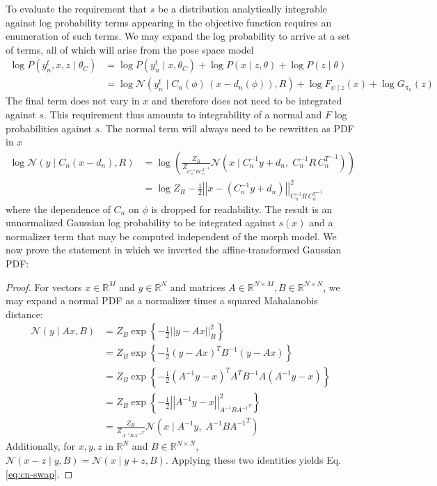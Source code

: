 \documentclass{article}         %
\newcommand{\inv}{^{-1}}
\newcommand{\RR}{\mathbb{R}}
\newcommand{\NN}{\mathcal{N}}
\newcommand{\norm}[1]{\left|\left| #1 \right|\right|}
\newcommand{\cb}[1]{\left\{ #1 \right\}}
\newcommand{\pn}[1]{\left( #1 \right)}
\begin{document}
To evaluate the requirement that $s$ be a distribution analytically integrable against log probability terms appearing in the objective function requires an enumeration of such terms. We may expand the log probability to arrive at a set of terms, all of which will arise from the pose space model
\begin{align}
    \log P(y^t_n, x, z \mid \theta_C) &= \log P(y^t_n \mid x, \theta_C) + \log P(x\mid z, \theta) + \log P(z\mid \theta) \\
    &= \log \NN(y^t_n \mid C_n(\phi)\, (x - d_n(\phi)), R) + \log F_{\psi\mid z}(x) + \log G_{\pi_n}(z)
    \label{eq:logprob-terms}
\end{align}
The final term does not vary in $x$ and therefore does not need to be integrated against $s$. This requirement thus amounts to integrability of a normal and $F$ log probabilities against $s$. The normal term will always need to be rewritten as PDF in $x$
\begin{align}
    \log \NN(y\mid C_n(x - d_n), R) &= \log\pn{\frac{Z_{R}}{Z_{C_n\inv R {C_n^T}\inv}} \NN\pn{x\mid C_n\inv y + d_n,\; C_n\inv R\, {C_n^T}\inv}} \\ &= \log Z_{R} - \frac{1}{2}\norm{x - (C_n\inv y + d_n)}^2_{C_n\inv R\, {C_n^T}\inv}
    \label{eq:cn-swap}
\end{align}
where the dependence of $C_n$ on $\phi$ is dropped for readability. The result is an unnormalized Gaussian log probability to be integrated against $s(x)$ and a normalizer term that may be computed independent of the morph model. We now prove the statement in which we inverted the affine-transformed Gaussian PDF:
\begin{proof} For vectors $x\in \RR^M$ and $y\in \RR^N$ and matrices $A\in \RR^{N\times M}, B\in \RR^{N\times N}$, we may expand a normal PDF as a normalizer times a squared Mahalanobis distance:
    \begin{align}
        \NN(y\mid Ax, B) &= Z_{B} \exp\cb{-\frac{1}{2}\norm{y - Ax}^2_{B}} \\
        &= Z_{B} \exp\cb{-\frac{1}{2}(y - Ax)^TB\inv(y - Ax)} \\
        &= Z_{B} \exp\cb{-\frac{1}{2}(A\inv y - x)^TA^TB\inv A(A\inv y - x)} \\
        &= Z_{B} \exp\cb{-\frac{1}{2}\norm{A\inv y - x}^2_{A\inv B{A\inv}^T}} \\
        &= \frac{Z_{B}}{Z_{A\inv B{A\inv}^T}} \NN\pn{x\mid A\inv y, \; A\inv B{A\inv}^T}
    \end{align}
Additionally, for $x,y,z$ in $\RR^N$ and $B\in\RR^{N\times N}$, $\NN(x - z \mid y, B) = \NN(x \mid y+z, B)$. Applying these two identities yields Eq. \ref{eq:cn-swap}.
\end{proof}
\end{document}
